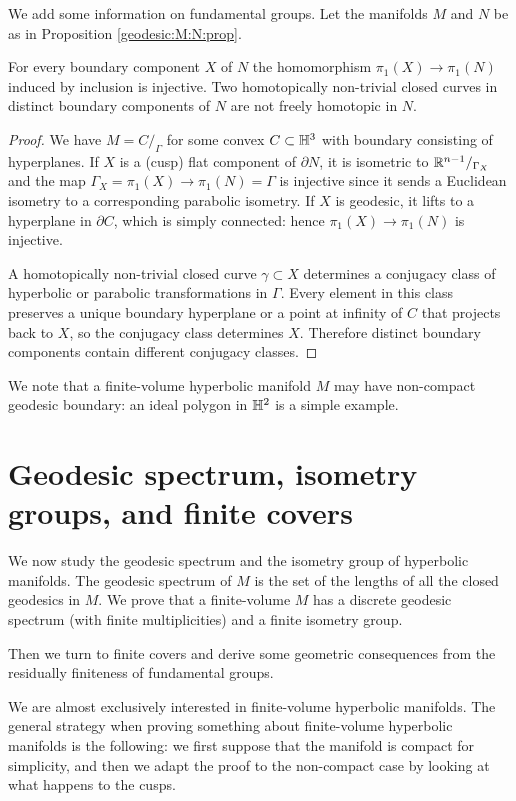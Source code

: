 We add some information on fundamental groups. Let the manifolds $M$ and $N$ be as in Proposition \ref{geodesic:M:N:prop}.

\begin{prop} \label{pi1:M:prop}
For every boundary component $X$ of $N$ the homomorphism $\pi_1(X)\to\pi_1(N)$ induced by inclusion is injective. Two homotopically non-trivial closed curves in distinct boundary components of $N$ are not freely homotopic in $N$.
\end{prop}
\begin{proof}
We have $M=C/_\Gamma$ for some convex $C\subset \mathbb{H}^3$ with boundary consisting of hyperplanes. If $X$ is a (cusp) flat component of $\partial N$, it is isometric to $\mathbb{R}^{n-1}/_{\Gamma_X}$ and the map $\Gamma_X=\pi_1(X) \to \pi_1(N)=\Gamma$ is injective since it sends a Euclidean isometry to a corresponding parabolic isometry.
If $X$ is geodesic, it lifts to a hyperplane in $\partial C$, which is simply connected: hence $\pi_1(X) \to \pi_1(N)$ is injective.

A homotopically non-trivial closed curve $\gamma\subset X$ determines a conjugacy class of hyperbolic or parabolic transformations in $\Gamma$. Every element in this class preserves a unique boundary hyperplane or a point at infinity of $C$ that projects back to $X$, so the conjugacy class determines $X$. Therefore distinct boundary components contain different conjugacy classes. 
\end{proof}

We note that a finite-volume hyperbolic manifold $M$ may have non-compact geodesic boundary: an ideal polygon in $\mathbb{H}^2$ is a simple example. 

\section{Geodesic spectrum, isometry groups, and finite covers} \label{geodesic:spectrum:section}
We now study the geodesic spectrum and the isometry group of hyperbolic manifolds. The geodesic spectrum of $M$ is the set of the lengths of all the closed geodesics in $M$. We prove that a finite-volume $M$ has a discrete geodesic spectrum (with finite multiplicities) and a finite isometry group.

Then we turn to finite covers and derive some geometric consequences from the residually finiteness of fundamental groups.

We are almost exclusively interested in finite-volume hyperbolic manifolds. The general strategy when proving something about finite-volume hyperbolic manifolds is the following: we first suppose that the manifold is compact for simplicity, and then we adapt the proof to the non-compact case by looking at what happens to the cusps.

